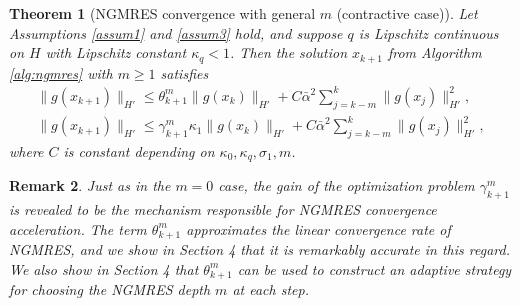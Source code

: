 \documentclass{article}
\numberwithin{equation}{section}
\newtheorem{thm}{Theorem}[section]
\newtheorem{remark}[thm]{Remark}
\begin{document}
\begin{thm}[NGMRES convergence with general $m$ (contractive case)]
\label{thm:ngmres}
  Let Assumptions \ref{assum1} and \ref{assum3} hold, and suppose $q$ is Lipschitz continuous on $H$ with Lipschitz constant $\kappa_q<1$.  Then the solution $x_{k+1}$ from Algorithm \ref{alg:ngmres} with $m\ge1$ satisfies     
     \begin{align}
     \label{eq:gx1mC}
        \| g(x_{k+1})\|_{H'} \le \theta^m_{k+1} \|g(x_k)\|_{H'} + C\bar\alpha^2  \sum\limits_{j=k-m}^k\|g(x_j)\|_{H'}^2, \\
         \| g(x_{k+1})\|_{H'} \le \gamma^m_{k+1} \kappa_1 \|g(x_k)\|_{H'} +  C\bar\alpha^2   \sum\limits_{j=k-m}^k\|g(x_j)\|_{H'}^2,
         \label{eq:gx2mC}
    \end{align}
    where $C$ is constant depending on $\kappa_0, \kappa_q, \sigma_1,  m$.
    
\end{thm}
\begin{remark} Just as in the $m=0$ case, the gain of the optimization problem  $\gamma^m_{k+1}$ is revealed to be the mechanism responsible for NGMRES convergence acceleration.  The term $\theta_{k+1}^m$ approximates the linear convergence rate of NGMRES, and we show in Section 4
that it is remarkably accurate in this regard.  We also show in Section 4 that $\theta_{k+1}^m$ can be used to construct an adaptive strategy for choosing the NGMRES depth $m$ at each step.
\end{remark}
\end{document}
